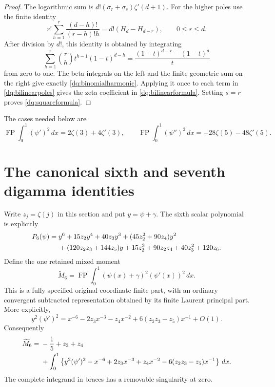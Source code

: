 \begin{proof}
The logarithmic sum is $d!(\sigma_r+\sigma_s)\zeta'(d+1)$.
For the higher poles use the finite identity
\begin{equation}\label{dq:binomialharmonic}
 r!\sum_{h=1}^r\frac{(d-h)!}{(r-h)!h}
                 =d!(H_d-H_{d-r}),\qquad0\le r\le d.
\end{equation}
After division by $d!$, this identity is obtained by integrating
\[
 \sum_{h=1}^r\binom rh t^{h-1}(1-t)^{d-h}
       =\frac{(1-t)^{d-r}-(1-t)^d}{t}
\]
from zero to one. The beta integrals on the left and the finite
geometric sum on the right give exactly \eqref{dq:binomialharmonic}.
Applying it once to each term in \eqref{dq:bilinearpoles} gives
the zeta coefficient in \eqref{dq:bilinearformula}. Setting $s=r$
proves \eqref{dq:squareformula}.
\end{proof}

The cases needed below are
\begin{equation}\label{dq:twosquares}
 \operatorname{FP}\int_0^1(\psi')^2\,dx=2\zeta(3)+4\zeta'(3),
 \qquad
 \operatorname{FP}\int_0^1(\psi'')^2\,dx=-28\zeta(5)-48\zeta'(5).
\end{equation}

\section{The canonical sixth and seventh digamma identities}
\label{dq:sixthsection}

Write $z_j=\zeta(j)$ in this section and put $y=\psi+\gamma$.
The sixth scalar polynomial is explicitly
\begin{align}
 P_6(\psi)={}&y^6+15z_2y^4+40z_3y^3
          +(45z_2^2+90z_4)y^2\notag\\
 &+(120z_2z_3+144z_5)y
     +15z_2^3+90z_2z_4+40z_3^2+120z_6.
 \label{dq:P6}
\end{align}
Define the one retained mixed moment
\begin{equation}\label{dq:M6}
 \widetilde M_6=\operatorname{FP}\int_0^1
                          (\psi(x)+\gamma)^2(\psi'(x))^2\,dx.
\end{equation}
This is a fully specified original-coordinate finite part, with an
ordinary convergent subtracted representation obtained by its finite
Laurent principal part.
More explicitly,
\begin{equation}\label{dq:M6principal}
 y^2(\psi')^2=x^{-6}-2z_3x^{-3}-z_4x^{-2}
                 +6(z_2z_3-z_5)x^{-1}+O(1).
\end{equation}
Consequently
\begin{align}
 \widetilde M_6={}&-\frac15+z_3+z_4\notag\\
 &+\int_0^1\left\{y^2(\psi')^2-x^{-6}+2z_3x^{-3}
         +z_4x^{-2}-6(z_2z_3-z_5)x^{-1}\right\}\,dx.
 \label{dq:M6ordinary}
\end{align}
The complete integrand in braces has a removable singularity at zero.

